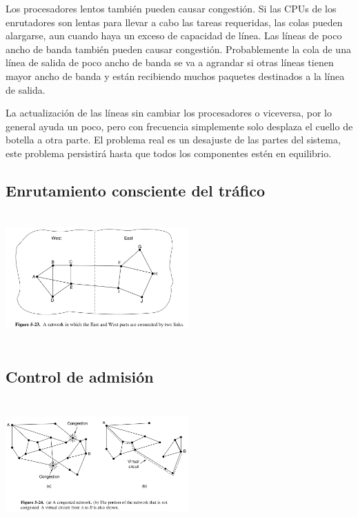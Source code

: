 \documentclass[10pt,a4paper]{report}
\begin{document}
	\par Los procesadores lentos también pueden causar congestión. Si las CPUs de los enrutadores son lentas para llevar a cabo las tareas requeridas, las colas pueden alargarse, aun cuando haya un exceso de capacidad de línea. Las líneas de poco ancho de banda también pueden causar congestión. Probablemente la cola de una línea de salida de poco ancho de banda se va a agrandar si otras líneas tienen mayor ancho de banda y están recibiendo muchos paquetes destinados a la línea de salida.

	\par La actualización de las líneas sin cambiar los procesadores o viceversa, por lo general ayuda un poco, pero con frecuencia simplemente solo desplaza el cuello de botella a otra parte. El problema real es un desajuste de las partes del sistema, este problema persistirá hasta que todos los componentes estén en equilibrio.

\subsection{Enrutamiento consciente del tráfico}

	\begin{center}
			\includegraphics[width=7cm, height=5cm]{./imagenes/consciente.png} 
	\end{center}

\subsection{Control de admisión}

	\begin{center}
			\includegraphics[width=7cm, height=5cm]{./imagenes/admision.png} 
	\end{center}
\end{document}
